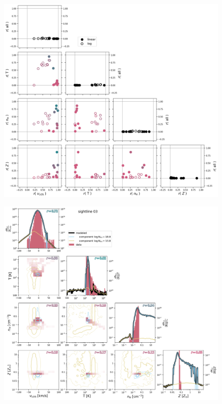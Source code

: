 \documentclass[fleqn,usenatbib]{mnras}
\begin{document}
\begin{figure}
    \centering
    \includegraphics[width=\textwidth]{figures/sample2/correlations_corner.png}
    \label{f: high-res corner}
\end{figure}

\begin{figure}
    \centering
    \includegraphics[width=\textwidth]{figures/sample2/sightline_0003.png}
    \label{f: sample2 03}
\end{figure}
\end{document}
